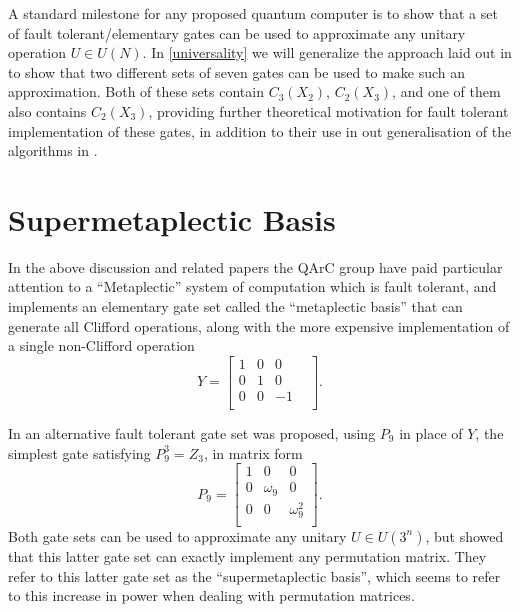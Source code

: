 A standard milestone for any proposed quantum computer is to show that a set of fault tolerant/elementary gates can be used to approximate any unitary operation $U \in U(N)$. In \autoref{universality} we will generalize the approach laid out in \cite{universal-qubit} to show that two different sets of seven gates can be used to make such an approximation. Both of these sets contain $C_3(X_2)$, $C_2(X_3)$, and one of them also contains $C_2(X_3)$, providing further theoretical motivation for fault tolerant implementation of these gates, in addition to their use in out generalisation of the algorithms in \cite{arithmetics}.

\section{Supermetaplectic Basis}\label{supermetaplectic}
In the above discussion and related papers the QArC group have paid particular attention to a ``Metaplectic'' system of computation which is fault tolerant, and implements an elementary gate set called the ``metaplectic basis'' that can generate all Clifford operations, along with the more expensive implementation of a single non-Clifford operation
\[Y = \begin{bmatrix}
1 & 0 & 0 & \\
0 & 1 & 0 & \\
0 & 0 & -1 & \\
\end{bmatrix}.\]

In \cite{arithmetics} an alternative fault tolerant gate set was proposed, using $P_9$ in place of $Y$, the simplest gate satisfying $P_9^3 = Z_3$, in matrix form
\[P_9 = \begin{bmatrix}
1 & 0 & 0 \\
0 & \omega_9 & 0 \\
0 & 0 & \omega_9^2 \\
\end{bmatrix}.\]
Both gate sets can be used to approximate any unitary $U \in U(3^n)$, but \cite{arithmetics} showed that this latter gate set can exactly implement any permutation matrix. They refer to this latter gate set as the ``supermetaplectic basis'', which seems to refer to this increase in power when dealing with permutation matrices.

